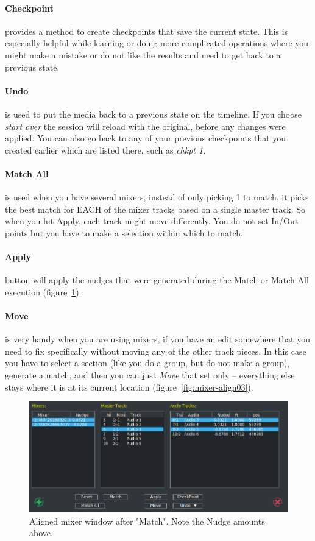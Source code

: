 \paragraph{Checkpoint} provides a method to create checkpoints that save the current state.  This is especially helpful while learning or doing more complicated operations where you might make a mistake or do not like the results and need to get back to a previous state.

\paragraph{Undo} is used to put the media back to a previous state on the timeline.  If you choose \textit{start over} the session will reload with the original, before any changes were applied.  You can also go back to any of your previous checkpoints that you created earlier which are listed there, such as \textit{chkpt 1}.

\paragraph{Match All}is used when you have several mixers, instead of only picking 1 to match, it picks the best match for EACH of the mixer tracks based on a single master track. So when you hit Apply, each track might move differently. You do not set In/Out points but you have to make a selection within which to match.

\paragraph{Apply} button will apply the nudges that were generated during the Match or Match All execution (figure~\ref{fig:mixer-align02}).

\paragraph{Move} is very handy when you are using mixers, if you have an edit somewhere that you need to fix specifically without moving any of the other track pieces. In this case you have to select a section (like you do a group, but do not make a group), generate a match, and then you can just \textit{Move} that set only -- everything else stays where it is at its current location (figure~\ref{fig:mixer-align03}).

\begin{figure}[htpb]
    \centering
    \includegraphics[width=0.9\linewidth]{images/mixer-align02.png}
    \caption{Aligned mixer window after "Match". Note the Nudge amounts above.}
    \label{fig:mixer-align02}
\end{figure}

